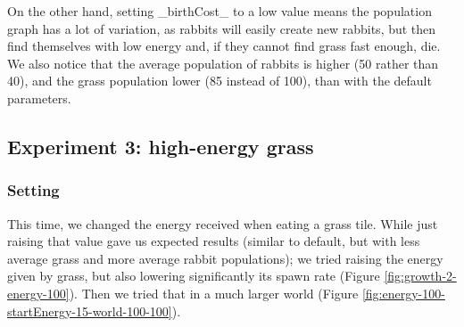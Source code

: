 \documentclass[11pt]{article}
\begin{document}
On the other hand, setting _birthCost_ to a low value means the population graph has a lot of variation, as rabbits will easily create new rabbits, but then find themselves with low energy and, if they cannot find grass fast enough, die. We also notice that the average population of rabbits is higher (50 rather than 40), and the grass population lower (85 instead of 100), than with the default parameters.



\subsection{Experiment 3: high-energy grass}

\subsubsection{Setting}
This time, we changed the energy received when eating a grass tile. While just raising that value gave us expected results (similar to default, but with less average grass and more average rabbit populations); we tried raising the energy given by grass, but also lowering significantly its spawn rate (Figure \ref{fig:growth-2-energy-100}). Then we tried that in a much larger world (Figure \ref{fig:energy-100-startEnergy-15-world-100-100}).
\end{document}
